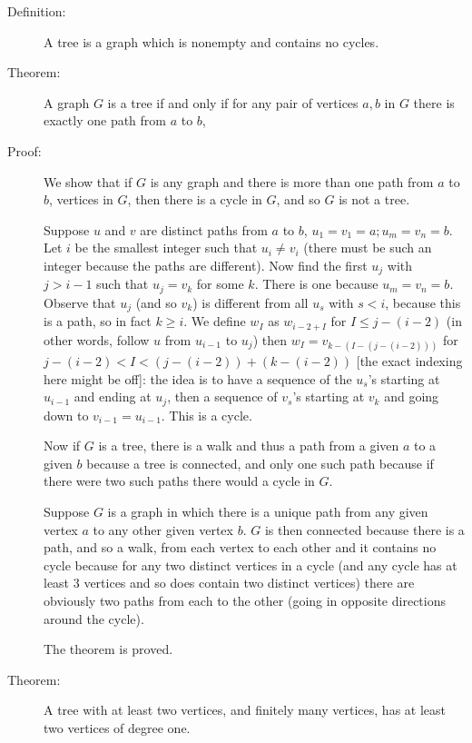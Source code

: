 \documentclass[12pt]{article}
\begin{document}
\begin{description}

\item[Definition:]  A tree is a graph which is nonempty and contains no cycles.

\item[Theorem:]  A graph $G$  is a tree if and only if for any pair of vertices $a,b$ in $G$ there is exactly one path from $a$ to $b$,

\item[Proof:]  We show that if $G$ is any graph and there is more than one path from $a$ to $b$, vertices in $G$,
then there is a cycle in $G$, and so $G$ is not a tree.

Suppose $u$ and $v$ are distinct paths from $a$ to $b$, $u_1 = v_1 = a;  u_m = v_n = b$. Let $i$ be the smallest integer such that
$u_i \neq v_i$ (there must be such an integer because the paths are different).  Now find the first $u_j$ with $j>i-1$ such that $u_j = v_k$ for some $k$.  There is one because $u_m = v_n = b$.  Observe that $u_j$ (and so $v_k$)
is different from all $u_s$ with $s<i$, because this is a path, so in fact $k\geq i$.   We define $w_I$ as $w_{i-2+I}$ for
$I \leq j-(i-2)$ (in other words, follow $u$ from $u_{i-1}$ to $u_j$) then $w_I = v_{k-(I-(j-(i-2)))}$ for $j-(i-2)<I<(j-(i-2))+(k-(i-2))$ [the exact indexing here might be off]:  the idea is to have a sequence of the $u_s$'s starting at $u_{i-1}$ and ending at $u_j$, then a sequence of $v_s$'s starting at $v_k$ and going down to $v_{i-1}=u_{i-1}$.  This is a cycle.

Now if $G$ is a tree, there is a walk and thus a path from a given $a$ to a given $b$ because a tree is connected, and only one such path because if there were two such paths there would a cycle in $G$.

Suppose $G$ is a graph in which there is a unique path from any given vertex $a$ to any other given vertex $b$.  $G$ is then connected because there is a path, and so a walk, from each vertex to each other and it contains no cycle because for any two distinct vertices in a cycle (and any cycle has at least 3 vertices and so does contain two distinct vertices) there are obviously two paths from each to the other (going in opposite directions around the cycle).

The theorem is proved.

\item[Theorem:]  A tree with at least two vertices, and finitely many vertices, has at least two vertices of degree one.


\end{description}
\end{document}
